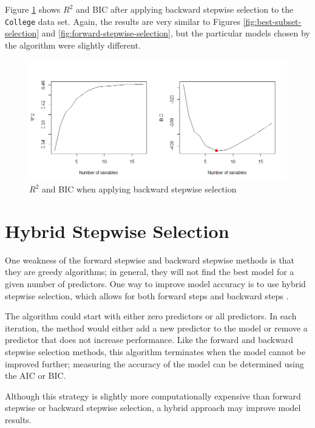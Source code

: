 \documentclass{article}
\begin{document}
Figure \ref{fig:backward-stepwise-selection} shows $R^2$ and BIC after applying backward stepwise selection to the \lstinline!College! data set. Again, the results are very similar to Figures \ref{fig:best-subset-selection} and \ref{fig:forward-stepwise-selection}, but the particular models chosen by the algorithm were slightly different. 

\begin{figure}[!h]
	\label{fig:backward-stepwise-selection}
	\centering
	\caption{$R^2$ and BIC when applying backward stepwise selection}
	\includegraphics[width = 6in]{backward-stepwise-selection.png}
\end{figure}

\section{Hybrid Stepwise Selection}
One weakness of the forward stepwise and backward stepwise methods is that they are greedy algorithms; in general, they will not find the best model for a given number of predictors. One way to improve model accuracy is to use hybrid stepwise selection, which allows for both forward steps and backward steps \cite{friedman2001elements}.

The algorithm could start with either zero predictors or all predictors. In each iteration, the method would either add a new predictor to the model or remove a predictor that does not increase performance. Like the forward and backward stepwise selection methods, this algorithm terminates when the model cannot be improved further; measuring the accuracy of the model can be determined using the AIC or BIC.

Although this strategy is slightly more computationally expensive than forward stepwise or backward stepwise selection, a hybrid approach may improve model results.
\end{document}

